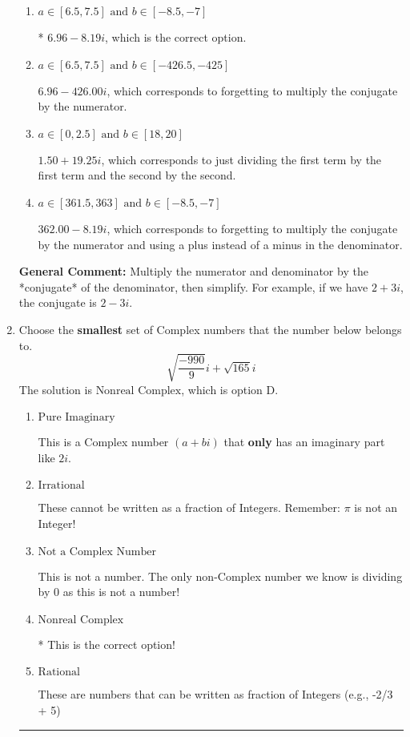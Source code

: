 \documentclass{extbook}[14pt]
\newcommand{\litem}[1]{\item #1

\rule{\textwidth}{0.4pt}}
\begin{document}
\begin{enumerate}
{\begin{enumerate}[label=\Alph*.]
 $-4.88  - 9.58 i$, which corresponds to forgetting to multiply the conjugate by the numerator and not computing the conjugate correctly.
\item \( a \in [6.5, 7.5] \text{ and } b \in [-8.5, -7] \)

* $6.96  - 8.19 i$, which is the correct option.
\item \( a \in [6.5, 7.5] \text{ and } b \in [-426.5, -425] \)

 $6.96  - 426.00 i$, which corresponds to forgetting to multiply the conjugate by the numerator.
\item \( a \in [0, 2.5] \text{ and } b \in [18, 20] \)

 $1.50  + 19.25 i$, which corresponds to just dividing the first term by the first term and the second by the second.
\item \( a \in [361.5, 363] \text{ and } b \in [-8.5, -7] \)

 $362.00  - 8.19 i$, which corresponds to forgetting to multiply the conjugate by the numerator and using a plus instead of a minus in the denominator.
\end{enumerate}

\textbf{General Comment:} Multiply the numerator and denominator by the *conjugate* of the denominator, then simplify. For example, if we have $2+3i$, the conjugate is $2-3i$.
}
\litem{
Choose the \textbf{smallest} set of Complex numbers that the number below belongs to.
\[ \sqrt{\frac{-990}{9}} i+\sqrt{165}i \]The solution is \( \text{Nonreal Complex} \), which is option D.\begin{enumerate}[label=\Alph*.]
\item \( \text{Pure Imaginary} \)

This is a Complex number $(a+bi)$ that \textbf{only} has an imaginary part like $2i$.
\item \( \text{Irrational} \)

These cannot be written as a fraction of Integers. Remember: $\pi$ is not an Integer!
\item \( \text{Not a Complex Number} \)

This is not a number. The only non-Complex number we know is dividing by 0 as this is not a number!
\item \( \text{Nonreal Complex} \)

* This is the correct option!
\item \( \text{Rational} \)

These are numbers that can be written as fraction of Integers (e.g., -2/3 + 5)
\end{enumerate}

}
\end{enumerate}
\end{document}
